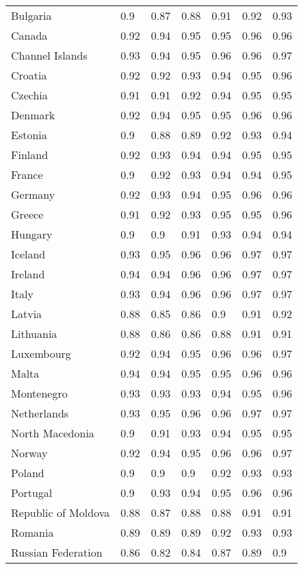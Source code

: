 \begin{longtable}[t]{lllllll}
Bulgaria & 0.9 & 0.87 & 0.88 & 0.91 & 0.92 & 0.93\\
Canada & 0.92 & 0.94 & 0.95 & 0.95 & 0.96 & 0.96\\
Channel Islands & 0.93 & 0.94 & 0.95 & 0.96 & 0.96 & 0.97\\
Croatia & 0.92 & 0.92 & 0.93 & 0.94 & 0.95 & 0.96\\
Czechia & 0.91 & 0.91 & 0.92 & 0.94 & 0.95 & 0.95\\
Denmark & 0.92 & 0.94 & 0.95 & 0.95 & 0.96 & 0.96\\
Estonia & 0.9 & 0.88 & 0.89 & 0.92 & 0.93 & 0.94\\
Finland & 0.92 & 0.93 & 0.94 & 0.94 & 0.95 & 0.95\\
France & 0.9 & 0.92 & 0.93 & 0.94 & 0.94 & 0.95\\
Germany & 0.92 & 0.93 & 0.94 & 0.95 & 0.96 & 0.96\\
Greece & 0.91 & 0.92 & 0.93 & 0.95 & 0.95 & 0.96\\
Hungary & 0.9 & 0.9 & 0.91 & 0.93 & 0.94 & 0.94\\
Iceland & 0.93 & 0.95 & 0.96 & 0.96 & 0.97 & 0.97\\
Ireland & 0.94 & 0.94 & 0.96 & 0.96 & 0.97 & 0.97\\
Italy & 0.93 & 0.94 & 0.96 & 0.96 & 0.97 & 0.97\\
Latvia & 0.88 & 0.85 & 0.86 & 0.9 & 0.91 & 0.92\\
Lithuania & 0.88 & 0.86 & 0.86 & 0.88 & 0.91 & 0.91\\
Luxembourg & 0.92 & 0.94 & 0.95 & 0.96 & 0.96 & 0.97\\
Malta & 0.94 & 0.94 & 0.95 & 0.95 & 0.96 & 0.96\\
Montenegro & 0.93 & 0.93 & 0.93 & 0.94 & 0.95 & 0.96\\
Netherlands & 0.93 & 0.95 & 0.96 & 0.96 & 0.97 & 0.97\\
North Macedonia & 0.9 & 0.91 & 0.93 & 0.94 & 0.95 & 0.95\\
Norway & 0.92 & 0.94 & 0.95 & 0.96 & 0.96 & 0.97\\
Poland & 0.9 & 0.9 & 0.9 & 0.92 & 0.93 & 0.93\\
Portugal & 0.9 & 0.93 & 0.94 & 0.95 & 0.96 & 0.96\\
Republic of Moldova & 0.88 & 0.87 & 0.88 & 0.88 & 0.91 & 0.91\\
Romania & 0.89 & 0.89 & 0.89 & 0.92 & 0.93 & 0.93\\
Russian Federation & 0.86 & 0.82 & 0.84 & 0.87 & 0.89 & 0.9\\

\end{longtable}
